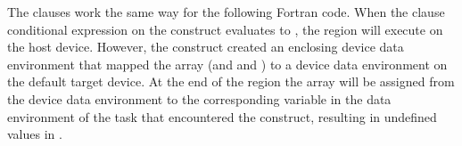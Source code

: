 
\pagebreak
The  clauses work the same way for the following Fortran code. When 
the  clause conditional expression on the  construct 
evaluates to , the  region will execute on the host 
device. However, the   construct created an enclosing 
device data environment that mapped the  array (and  and ) to a device data 
environment on the default target device. At the end of the   
region the  array will be assigned from the device data environment to the corresponding 
variable in the data environment of the task that encountered the  
 construct, resulting in undefined values in .


